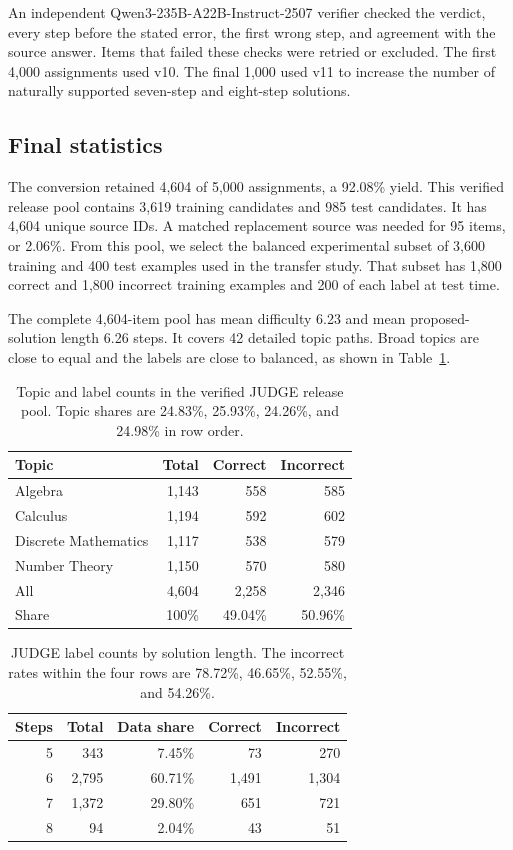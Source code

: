 \documentclass[11pt]{article}
\begin{document}
An independent Qwen3-235B-A22B-Instruct-2507 verifier checked the verdict, every step before the stated error, the first wrong step, and agreement with the source answer. Items that failed these checks were retried or excluded. The first 4,000 assignments used v10. The final 1,000 used v11 to increase the number of naturally supported seven-step and eight-step solutions.

\subsection{Final statistics}

The conversion retained 4,604 of 5,000 assignments, a 92.08\% yield. This verified release pool contains 3,619 training candidates and 985 test candidates. It has 4,604 unique source IDs. A matched replacement source was needed for 95 items, or 2.06\%. From this pool, we select the balanced experimental subset of 3,600 training and 400 test examples used in the transfer study. That subset has 1,800 correct and 1,800 incorrect training examples and 200 of each label at test time.

The complete 4,604-item pool has mean difficulty 6.23 and mean proposed-solution length 6.26 steps. It covers 42 detailed topic paths. Broad topics are close to equal and the labels are close to balanced, as shown in Table~\ref{tab:judge-main-stats}.

\begin{table}[t]
\centering
\small
\setlength{\tabcolsep}{4pt}
\begin{tabular}{lrrr}
\toprule
Topic & Total & Correct & Incorrect \\
\midrule
Algebra & 1,143 & 558 & 585 \\
Calculus & 1,194 & 592 & 602 \\
Discrete Mathematics & 1,117 & 538 & 579 \\
Number Theory & 1,150 & 570 & 580 \\
\midrule
All & 4,604 & 2,258 & 2,346 \\
Share & 100\% & 49.04\% & 50.96\% \\
\bottomrule
\end{tabular}
\caption{Topic and label counts in the verified JUDGE release pool. Topic shares are 24.83\%, 25.93\%, 24.26\%, and 24.98\% in row order.}
\label{tab:judge-main-stats}
\end{table}

\begin{table}[t]
\centering
\small
\setlength{\tabcolsep}{4pt}
\begin{tabular}{rrrrr}
\toprule
Steps & Total & Data share & Correct & Incorrect \\
\midrule
5 & 343 & 7.45\% & 73 & 270 \\
6 & 2,795 & 60.71\% & 1,491 & 1,304 \\
7 & 1,372 & 29.80\% & 651 & 721 \\
8 & 94 & 2.04\% & 43 & 51 \\
\bottomrule
\end{tabular}
\caption{JUDGE label counts by solution length. The incorrect rates within the four rows are 78.72\%, 46.65\%, 52.55\%, and 54.26\%.}
\label{tab:judge-steps}
\end{table}
\end{document}
